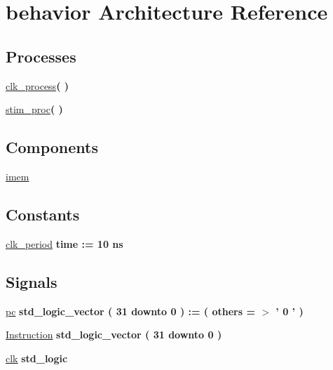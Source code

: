 \hypertarget{class_imem__tb_1_1behavior}{\section{behavior \-Architecture \-Reference}
\label{class_imem__tb_1_1behavior}
}
\*
\*
\subsection*{\-Processes}
 \begin{DoxyCompactItemize}
\item 
\hyperlink{class_imem__tb_1_1behavior_ac5bb218131b813f7908ec89476b31fca}{clk\-\_\-process}{\bfseries  (  )}
\item 
\hyperlink{class_imem__tb_1_1behavior_ad2efa6785cff833c341e27596b21aeb5}{stim\-\_\-proc}{\bfseries  (  )}
\end{DoxyCompactItemize}
\subsection*{\-Components}
 \begin{DoxyCompactItemize}
\item 
\hyperlink{class_imem__tb_1_1behavior_ac4e5786a088bdf818981004337212e04}{imem}  {\bfseries }  
\end{DoxyCompactItemize}
\subsection*{\-Constants}
 \begin{DoxyCompactItemize}
\item 
\hyperlink{class_imem__tb_1_1behavior_a6fb633437cba4c796dace5ed8efe52e1}{clk\-\_\-period} {\bfseries time  \-:=  10  ns } 
\end{DoxyCompactItemize}
\subsection*{\-Signals}
 \begin{DoxyCompactItemize}
\item 
\hyperlink{class_imem__tb_1_1behavior_a910b9e51355861e290a75682f69dbdb9}{pc} {\bfseries std\-\_\-logic\-\_\-vector (   31    downto    0  )  \-:= (  others  = $>$ '  0  '  ) } 
\item 
\hyperlink{class_imem__tb_1_1behavior_aae3aad9bd44aff424227364afa096538}{\-Instruction} {\bfseries std\-\_\-logic\-\_\-vector (   31    downto    0  ) } 
\item 
\hyperlink{class_imem__tb_1_1behavior_a4934ba9011613a19cbbdc771190f9653}{clk} {\bfseries std\-\_\-logic } 
\end{DoxyCompactItemize}


